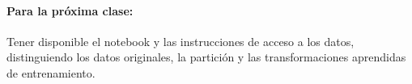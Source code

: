 \documentclass[a4,11pt]{aleph-notas}
\begin{document}
\paragraph{Para la próxima clase:}
    Tener disponible el notebook y las instrucciones de acceso a los datos, distinguiendo los datos originales, la partición y las transformaciones aprendidas de entrenamiento.
\end{document}
